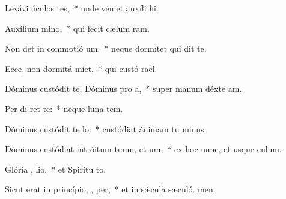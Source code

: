 \item Levávi óculos   tes,~* unde véniet auxíli hi.
\item Auxílium   mino,~* qui fecit cælum  ram.
\item Non det in commotió  um:~* neque dormítet qui dit te.
\item Ecce, non dormitá  miet,~* qui custó raël.
\item Dóminus custódit te, Dóminus pro a,~* super manum déxte am.
\item Per di   ret te:~* neque luna  tem.
\item Dóminus custódit te   lo:~* custódiat ánimam tu minus.
\item Dóminus custódiat intróitum tuum, et  um:~* ex hoc nunc, et usque  culum.
\item Glória ,  lio,~* et Spirítu to.
\item Sicut erat in princípio,  ,  per,~* et in sǽcula sæculó. men.
